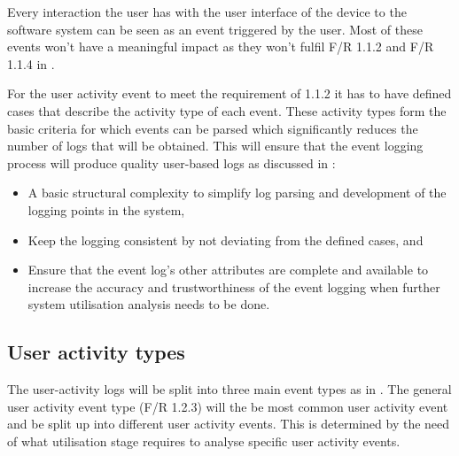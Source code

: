 Every interaction the user has with the user interface of the device to the software system can be seen as an event triggered by the user. Most of these events won't have a meaningful impact as they won't fulfil F/R 1.1.2 and F/R 1.1.4 in .\par For the user activity event to meet the requirement of 1.1.2 it has to have defined cases that describe the activity type of each event. These activity types form the basic criteria for which events can be parsed which significantly reduces the number of logs that will be obtained. This will ensure that the event logging process will produce quality user-based logs as discussed in :

\begin{itemize}
	\item A basic structural complexity to simplify log parsing and development of the logging points in the system,
	\item Keep the logging consistent by not deviating from the defined cases, and
	\item Ensure that the event log's other attributes are complete and available to increase the accuracy and trustworthiness of the event logging when further system utilisation analysis needs to be done. 
\end{itemize}

\subsection{User activity types}\label{sec:ch2_userActivityTypes}
The user-activity logs will be split into three main event types as in . The general user activity event type (F/R 1.2.3) will the be most common user activity event and be split up into different user activity events. This is determined by the need of what utilisation stage requires to analyse specific user activity events. 

